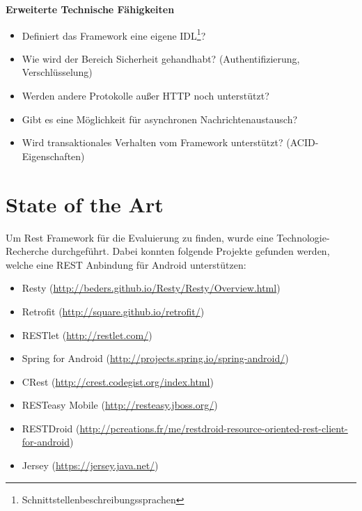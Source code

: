 \documentclass[a4paper,11pt,german,public]{INSOexpose}
\begin{document}
\textbf{Erweiterte Technische Fähigkeiten}
\begin{itemize}[label=$-$]
	\item Definiert das Framework eine eigene IDL\footnote{Schnittstellenbeschreibungssprachen}?
	\item Wie wird der Bereich Sicherheit gehandhabt?  (Authentifizierung, Verschlüsselung)
	\item Werden andere Protokolle außer HTTP noch unterstützt?
	\item Gibt es eine Möglichkeit für asynchronen Nachrichtenaustausch?
	\item Wird transaktionales Verhalten vom Framework unterstützt? (ACID-Eigenschaften)
\end{itemize}

\section{State of the Art}
Um Rest Framework für die Evaluierung zu finden, wurde eine Technologie-Recherche durchgeführt. Dabei konnten folgende Projekte gefunden werden, welche eine REST Anbindung für Android unterstützen:
\begin{itemize}
	\item Resty (\href{http://beders.github.io/Resty/Resty/Overview.html}{http://beders.github.io/Resty/Resty/Overview.html})
	\item Retrofit (\href{http://square.github.io/retrofit/}{http://square.github.io/retrofit/})
	\item RESTlet (\href{http://restlet.com/}{http://restlet.com/})
	\item Spring for Android (\href{http://projects.spring.io/spring-android/}{http://projects.spring.io/spring-android/})
	\item CRest (\href{http://crest.codegist.org/index.html}{http://crest.codegist.org/index.html})
	\item RESTeasy Mobile (\href{http://resteasy.jboss.org/}{http://resteasy.jboss.org/})
	\item RESTDroid (\href{http://pcreations.fr/me/restdroid-resource-oriented-rest-client-for-android}{http://pcreations.fr/me/restdroid-resource-oriented-rest-client-for-android})
	\item Jersey (\href{https://jersey.java.net/}{https://jersey.java.net/})
\end{itemize}
\end{document}
